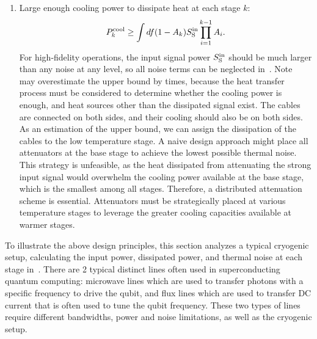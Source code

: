 \documentclass[a4paper,onecolumn,11pt,unpublished]{quantumarticle}
\begin{document}
\begin{enumerate}
  \item Large enough cooling power to dissipate heat at each stage $k$:
        \begin{equation}
          P^{\mathrm{cool}}_{k} \ge \int df (1-A_k)S^{\mathrm{in}}_{\mathrm{S}}\prod_{i=1}^{k-1}A_i. \label{eq:cryo_cond_3_cooling_power}
        \end{equation}
        For high-fidelity operations, the input signal power $S^{\mathrm{in}}_{\mathrm{S}}$ should be much larger than any noise at any level, so all noise terms can be neglected in~. Note~ may overestimate the upper bound by times, because the heat transfer process must be considered to determine whether the cooling power is enough, and heat sources other than the dissipated signal exist. The cables are connected on both sides, and their cooling should also be on both sides. As an estimation of the upper bound, we can assign the dissipation of the cables to the low temperature stage.
        A naive design approach might place all attenuators at the base stage to achieve the lowest possible thermal noise. This strategy is unfeasible, as the heat dissipated from attenuating the strong input signal would overwhelm the cooling power available at the base stage, which is the smallest among all stages. Therefore, a distributed attenuation scheme is essential. Attenuators must be strategically placed at various temperature stages to leverage the greater cooling capacities available at warmer stages.

\end{enumerate}

To illustrate the above design principles, this section analyzes a typical cryogenic setup, calculating the input power, dissipated power, and thermal noise at each stage in~. There are 2 typical distinct lines often used in superconducting quantum computing: microwave lines which are used to transfer photons with a specific frequency to drive the qubit, and flux lines which are used to transfer DC current that is often used to tune the qubit frequency. These two types of lines require different bandwidths, power and noise limitations, as well as the cryogenic setup.
\end{document}
